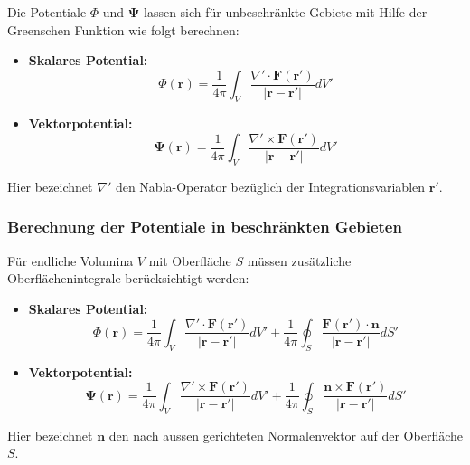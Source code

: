 Die Potentiale $\Phi$ und $\mathbf{\Psi}$ lassen sich für unbeschränkte Gebiete mit Hilfe der Greenschen Funktion wie folgt berechnen:

\begin{itemize}
\item \textbf{Skalares Potential:}
\begin{equation}
\Phi(\mathbf{r}) = \frac{1}{4 \pi} \int_{V} \frac{\nabla' \cdot \mathbf{F}(\mathbf{r'})}{|\mathbf{r} - \mathbf{r'}|} dV'
\end{equation}

\item \textbf{Vektorpotential:}
\begin{equation}
\mathbf{\Psi}(\mathbf{r}) = \frac{1}{4 \pi} \int_{V} \frac{\nabla' \times \mathbf{F}(\mathbf{r'})}{|\mathbf{r} - \mathbf{r'}|} dV'
\end{equation}
\end{itemize}

Hier bezeichnet $\nabla'$ den Nabla-Operator bezüglich der Integrationsvariablen $\mathbf{r'}$.

\subsubsection{Berechnung der Potentiale in beschränkten Gebieten}

Für endliche Volumina $V$ mit Oberfläche $S$ müssen zusätzliche Oberflächenintegrale berücksichtigt werden:

\begin{itemize}
\item \textbf{Skalares Potential:}
\begin{equation}
\Phi (\mathbf{r}) = \frac{1}{4\pi} \int_V \frac{\nabla' \cdot \mathbf{F}(\mathbf{r}')}{|\mathbf{r} - \mathbf{r}'|} dV' + \frac{1}{4\pi} \oint_S \frac{\mathbf{F}(\mathbf{r}') \cdot \mathbf{n}}{|\mathbf{r} - \mathbf{r}'|} dS'
\end{equation}

\item \textbf{Vektorpotential:}
\begin{equation}
\mathbf{\Psi}(\mathbf{r}) = \frac{1}{4\pi} \int_V \frac{\nabla' \times \mathbf{F}(\mathbf{r}')}{|\mathbf{r} - \mathbf{r}'|} dV' + \frac{1}{4\pi} \oint_S \frac{\mathbf{n} \times \mathbf{F}(\mathbf{r}')}{|\mathbf{r} - \mathbf{r}'|} dS'
\end{equation}
\end{itemize}

Hier bezeichnet $\mathbf{n}$ den nach aussen gerichteten Normalenvektor auf der Oberfläche $S$.

